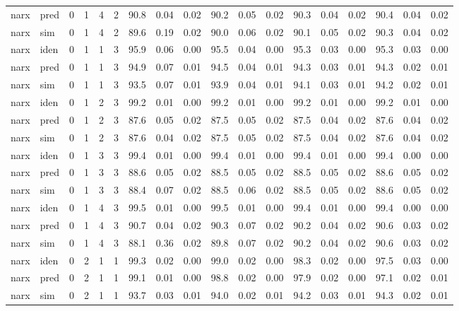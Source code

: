 \begin{landscape}
\begin{center}
\begin{longtable}{ll|cccc|ccc|ccc|ccc|ccc}
narx & pred & 0 & 1 & 4 & 2 & 90.8 & 0.04 & 0.02 & 90.2 & 0.05 & 0.02 & 90.3 & 0.04 & 0.02 & 90.4 & 0.04 & 0.02 \\ 
narx & sim  & 0 & 1 & 4 & 2 & 89.6 & 0.19 & 0.02 & 90.0 & 0.06 & 0.02 & 90.1 & 0.05 & 0.02 & 90.3 & 0.04 & 0.02 \\ 
 \hline 
narx & iden & 0 & 1 & 1 & 3 & 95.9 & 0.06 & 0.00 & 95.5 & 0.04 & 0.00 & 95.3 & 0.03 & 0.00 & 95.3 & 0.03 & 0.00 \\ 
narx & pred & 0 & 1 & 1 & 3 & 94.9 & 0.07 & 0.01 & 94.5 & 0.04 & 0.01 & 94.3 & 0.03 & 0.01 & 94.3 & 0.02 & 0.01 \\ 
narx & sim  & 0 & 1 & 1 & 3 & 93.5 & 0.07 & 0.01 & 93.9 & 0.04 & 0.01 & 94.1 & 0.03 & 0.01 & 94.2 & 0.02 & 0.01 \\ 
 \hline 
narx & iden & 0 & 1 & 2 & 3 & 99.2 & 0.01 & 0.00 & 99.2 & 0.01 & 0.00 & 99.2 & 0.01 & 0.00 & 99.2 & 0.01 & 0.00 \\ 
narx & pred & 0 & 1 & 2 & 3 & 87.6 & 0.05 & 0.02 & 87.5 & 0.05 & 0.02 & 87.5 & 0.04 & 0.02 & 87.6 & 0.04 & 0.02 \\ 
narx & sim  & 0 & 1 & 2 & 3 & 87.6 & 0.04 & 0.02 & 87.5 & 0.05 & 0.02 & 87.5 & 0.04 & 0.02 & 87.6 & 0.04 & 0.02 \\ 
 \hline 
narx & iden & 0 & 1 & 3 & 3 & 99.4 & 0.01 & 0.00 & 99.4 & 0.01 & 0.00 & 99.4 & 0.01 & 0.00 & 99.4 & 0.00 & 0.00 \\ 
narx & pred & 0 & 1 & 3 & 3 & 88.6 & 0.05 & 0.02 & 88.5 & 0.05 & 0.02 & 88.5 & 0.05 & 0.02 & 88.6 & 0.05 & 0.02 \\ 
narx & sim  & 0 & 1 & 3 & 3 & 88.4 & 0.07 & 0.02 & 88.5 & 0.06 & 0.02 & 88.5 & 0.05 & 0.02 & 88.6 & 0.05 & 0.02 \\ 
 \hline 
narx & iden & 0 & 1 & 4 & 3 & 99.5 & 0.01 & 0.00 & 99.5 & 0.01 & 0.00 & 99.4 & 0.01 & 0.00 & 99.4 & 0.00 & 0.00 \\ 
narx & pred & 0 & 1 & 4 & 3 & 90.7 & 0.04 & 0.02 & 90.3 & 0.07 & 0.02 & 90.2 & 0.04 & 0.02 & 90.6 & 0.03 & 0.02 \\ 
narx & sim  & 0 & 1 & 4 & 3 & 88.1 & 0.36 & 0.02 & 89.8 & 0.07 & 0.02 & 90.2 & 0.04 & 0.02 & 90.6 & 0.03 & 0.02 \\ 
 \hline 
narx & iden & 0 & 2 & 1 & 1 & 99.3 & 0.02 & 0.00 & 99.0 & 0.02 & 0.00 & 98.3 & 0.02 & 0.00 & 97.5 & 0.03 & 0.00 \\ 
narx & pred & 0 & 2 & 1 & 1 & 99.1 & 0.01 & 0.00 & 98.8 & 0.02 & 0.00 & 97.9 & 0.02 & 0.00 & 97.1 & 0.02 & 0.01 \\ 
narx & sim  & 0 & 2 & 1 & 1 & 93.7 & 0.03 & 0.01 & 94.0 & 0.02 & 0.01 & 94.2 & 0.03 & 0.01 & 94.3 & 0.02 & 0.01 \\ 

\end{longtable}
\end{center}
\end{landscape}
